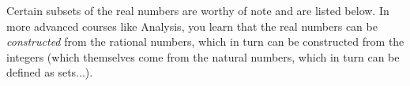 
\medskip

Certain subsets of the real numbers are worthy of note and are listed below.  In more advanced courses like Analysis, you learn that the real numbers can be {\em constructed} from the rational numbers, which in turn can be constructed from the integers (which themselves come from the natural numbers, which in turn can be defined as sets...).

\medskip

\label{setsofnumbersboxonthispage}
\setboxwidth{30pt}
\noindent\hskip-12pt
